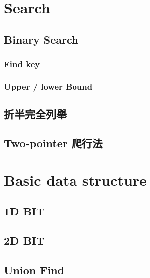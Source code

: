 \documentclass[10pt,twocolumn,oneside]{article} %
\begin{document}

\section{Search}

\subsection{Binary Search}

\subsubsection{Find key}

\subsubsection{Upper / lower Bound}

\subsection{折半完全列舉}

\subsection{Two-pointer 爬行法}


\section{Basic data structure}

\subsection{1D BIT}

%

\subsection{2D BIT}

\subsection{Union Find}

%
\end{document}
